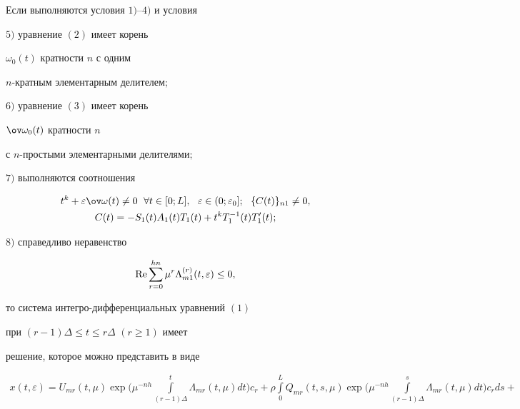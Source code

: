 \begin{thm} 


Если выполняются условия $1)$--$4)$ и условия 


 


$5)$ уравнение $(2)$ имеет корень 


$\omega_0(t)$ кратности $n$ с одним 


$n$-кратным элементарным делителем$;$ 


 


$6)$ уравнение $(3)$ имеет корень 


$\ov\omega_0(t)$ кратности $n$ 


с $n$-простыми элементарными делителями$;$ 


 


$7)$ выполняются соотношения 


\begin{gather*} 


t^k+\varepsilon\ov\omega(t)\ne0\ \; \forall t\in[0;L], 


\ \ \varepsilon\in(0;\varepsilon_0];\ \ \{C(t)\}_{n1}\ne0, \\


%


C(t)=-S_1(t)A_1(t)T_1(t)+t^k T^{-1}_1(t)T'_1(t); 


\end{gather*} 


 


$8)$ справедливо неравенство 


$$ 


\re\sum^{hn}_{r=0}\mu^r\Lambda^{(r)}_{m1}(t,\varepsilon)\le0, 


$$ 


то система интегро-дифференциальных уравнений $(1)$ 


при $(r-1)\Delta\le t\le r\Delta$ $(r\ge1)$ имеет 


решение, которое можно представить в виде 


\begin{gather*} 


x(t,\varepsilon)=U_{mr}(t,\mu)\exp\bigg(\mu^{-nh} 


\int\limits^t_{(r-1)\Delta}\Lambda_{mr}(t,\mu)dt\bigg)c_r+ 


\rho\int\limits^L_0 Q_{mr}(t,s,\mu)\exp\bigg(\mu^{-nh} 


\int\limits^s_{(r-1)\Delta}\Lambda_{mr}(t,\mu)dt\bigg)c_r ds+\\ 



\end{gather*}
\end{thm}
